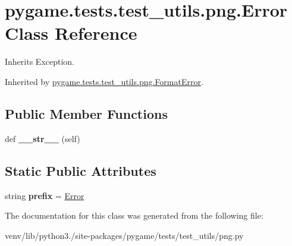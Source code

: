 \hypertarget{classpygame_1_1tests_1_1test__utils_1_1png_1_1_error}{}\section{pygame.\+tests.\+test\+\_\+utils.\+png.\+Error Class Reference}
\label{classpygame_1_1tests_1_1test__utils_1_1png_1_1_error}


Inherits Exception.



Inherited by \hyperlink{classpygame_1_1tests_1_1test__utils_1_1png_1_1_format_error}{pygame.\+tests.\+test\+\_\+utils.\+png.\+Format\+Error}.

\subsection*{Public Member Functions}
\begin{DoxyCompactItemize}
\item 
\mbox{\label{classpygame_1_1tests_1_1test__utils_1_1png_1_1_error_afb85b5489389b9683363ba3129d24e40}} 
def {\bfseries \+\_\+\+\_\+str\+\_\+\+\_\+} (self)
\end{DoxyCompactItemize}
\subsection*{Static Public Attributes}
\begin{DoxyCompactItemize}
\item 
\mbox{\label{classpygame_1_1tests_1_1test__utils_1_1png_1_1_error_a21c407ad9916691d124cbf37dab332aa}} 
string {\bfseries prefix} = \textquotesingle{}\hyperlink{classpygame_1_1tests_1_1test__utils_1_1png_1_1_error}{Error}\textquotesingle{}
\end{DoxyCompactItemize}


The documentation for this class was generated from the following file\+:\begin{DoxyCompactItemize}
\item 
venv/lib/python3./site-\/packages/pygame/tests/test\+\_\+utils/png.\+py\end{DoxyCompactItemize}
